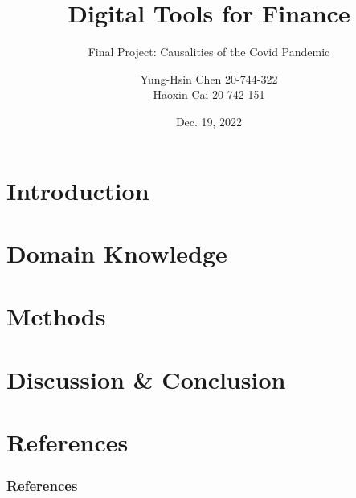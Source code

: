 \documentclass{beamer}
\title[Final Project Presentation]{Digital Tools for Finance}
\subtitle{Final Project: Causalities of the Covid Pandemic}
\author[Y. Chen, H. Cai]{Yung-Hsin Chen 20-744-322
\\ Haoxin Cai 20-742-151}
\institute[IfI, UZH]{Department of Informatics\\University of Zurich}
\date{Dec. 19, 2022}
\begin{document}
\begin{frame}
\titlepage
\end{frame}


\section{Introduction}


\section{Domain Knowledge}


\section{Methods}


\section{Discussion \& Conclusion}



\section*{References}
\begin{frame}
    \frametitle{References}
    
    
\end{frame}
\end{document}
